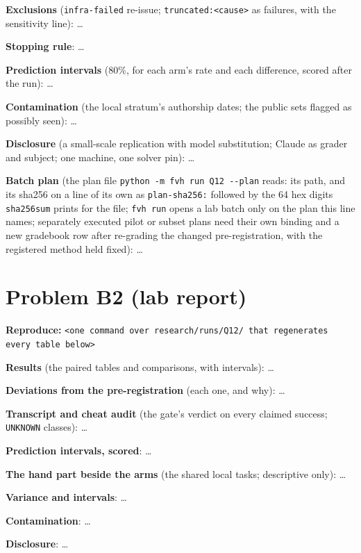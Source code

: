 \documentclass[11pt]{article}
\begin{document}
\begin{answer}
\textbf{Exclusions} (\texttt{infra-failed} re-issue; \texttt{truncated:<cause>}
as failures, with the sensitivity line): \dots

\textbf{Stopping rule}: \dots

\textbf{Prediction intervals} (80\%, for each arm's rate and each difference,
scored after the run): \dots

\textbf{Contamination} (the local stratum's authorship dates; the public sets
flagged as possibly seen): \dots

\textbf{Disclosure} (a small-scale replication with model substitution; Claude as
grader and subject; one machine, one solver pin): \dots

\textbf{Batch plan} (the plan file \texttt{python -m fvh run Q12 -{}-plan}
reads: its path, and its sha256 on a line of its own as \texttt{plan-sha256:}
followed by the 64 hex digits \texttt{sha256sum} prints for the file;
\texttt{fvh run} opens a lab batch only on the plan this line names;
separately executed pilot or subset plans need their own binding and a new
gradebook row after re-grading the changed pre-registration, with the
registered method held fixed): \dots
\end{answer}

\section*{Problem B2 (lab report)}\label{ans:B2}
\begin{answer}
\textbf{Reproduce:} \verb+<one command over research/runs/Q12/ that regenerates every table below>+

\textbf{Results} (the paired tables and comparisons, with intervals): \dots

\textbf{Deviations from the pre-registration} (each one, and why): \dots

\textbf{Transcript and cheat audit} (the gate's verdict on every claimed
success; \texttt{UNKNOWN} classes): \dots

\textbf{Prediction intervals, scored}: \dots

\textbf{The hand part beside the arms} (the shared local tasks; descriptive
only): \dots

\textbf{Variance and intervals}: \dots

\textbf{Contamination}: \dots

\textbf{Disclosure}: \dots
\end{answer}

\end{document}
